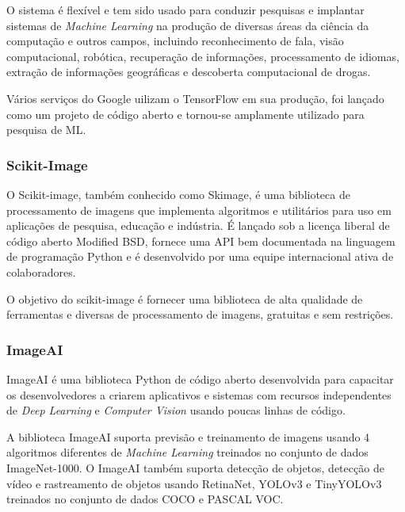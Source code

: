 O sistema é flexível e tem sido usado para conduzir pesquisas e implantar sistemas de \textit{Machine Learning} na produção de diversas áreas da ciência da computação e outros campos, incluindo reconhecimento de fala, visão computacional, robótica, recuperação de informações, processamento de idiomas, extração de informações geográficas e descoberta computacional de drogas. \cite{abadi2016tensorflow}

Vários serviços do Google uilizam o TensorFlow em sua produção, foi lançado como um projeto de código aberto e tornou-se amplamente utilizado para pesquisa de ML.\cite{199317}


\subsubsection{Scikit-Image}

O Scikit-image, também conhecido como Skimage, é uma biblioteca de processamento de imagens que implementa algoritmos e utilitários para uso em aplicações de pesquisa, educação e indústria. É lançado sob a licença liberal de código aberto Modified BSD, fornece uma API bem documentada na linguagem de programação Python e é desenvolvido por uma equipe internacional ativa de colaboradores.

O objetivo do scikit-image é fornecer uma biblioteca de alta qualidade de ferramentas e diversas de processamento de imagens, gratuitas e sem restrições. \cite{skimage}


\subsubsection{ImageAI}

ImageAI é uma biblioteca Python de código aberto desenvolvida para capacitar os desenvolvedores a criarem aplicativos e sistemas com recursos independentes de \textit{Deep Learning} e \textit{Computer Vision} usando poucas linhas de código.

A biblioteca ImageAI suporta previsão e treinamento de imagens usando 4 algoritmos diferentes de \textit{Machine Learning} treinados no conjunto de dados ImageNet-1000. O ImageAI também suporta detecção de objetos, detecção de vídeo e rastreamento de objetos usando RetinaNet, YOLOv3 e TinyYOLOv3 treinados no conjunto de dados COCO e PASCAL VOC.\cite{ImageAI}

